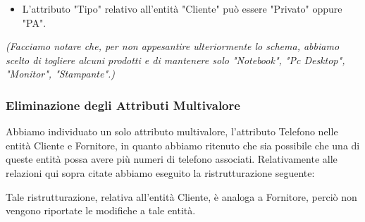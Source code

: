 \begin{itemize}
  \item L'attributo "Tipo" relativo all'entità "Cliente" può essere "Privato" oppure "PA".
\end{itemize}
\noindent
\textit{(Facciamo notare che, per non appesantire ulteriormente lo schema, abbiamo scelto di togliere alcuni prodotti e di mantenere solo "Notebook", "Pc Desktop", "Monitor", "Stampante".)}



\newpage
\begin{landscape} %



\end{landscape}


\newpage
\subsubsection{Eliminazione degli Attributi Multivalore}

Abbiamo individuato un solo attributo multivalore, l'attributo Telefono nelle entità Cliente e Fornitore, in quanto abbiamo ritenuto che sia possibile che una di queste entità possa avere più numeri di telefono associati.
\newline
Relativamente alle relazioni qui sopra citate abbiamo eseguito la ristrutturazione seguente:
\newline\newline

\noindent{}
\newline\newline
Tale ristrutturazione, relativa all'entità Cliente, è analoga a Fornitore, perciò non vengono riportate le modifiche a tale entità.
